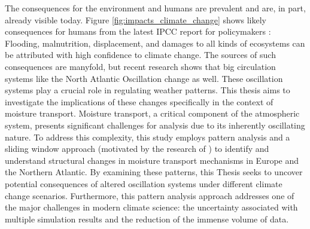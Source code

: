 The consequences for the environment and humans are prevalent and are, in part, already visible today. 
Figure \ref{fig:impacts_climate_change} shows likely consequences for humans from the latest IPCC report for policymakers \cite{lee2024climate}: Flooding, malnutrition, displacement, and damages to all kinds of ecosystems can be attributed with high confidence to climate change. 
The sources of such consequences are manyfold, but recent research shows that big circulation systems like the North Atlantic Oscillation\cite{vietinghoff_visual_2021} change as well. 
These oscillation systems play a crucial role in regulating weather patterns.
This thesis aims to investigate the implications of these changes specifically in the context of moisture transport.
Moisture transport, a critical component of the atmospheric system, presents significant challenges for analysis due to its inherently oscillating nature. 
To address this complexity, this study employs pattern analysis  and a sliding window approach (motivated by the research of \citeauthor{vietinghoff_visual_2021}) to identify and understand structural changes in moisture transport mechanisms in Europe and the Northern Atlantic. 
By examining these patterns, this Thesis seeks to uncover potential consequences of altered oscillation systems under different climate change scenarios.
Furthermore, this pattern analysis approach addresses one of the major challenges in modern climate science: the uncertainty associated with multiple simulation results and the reduction of the immense volume of data. 

%
%
%


